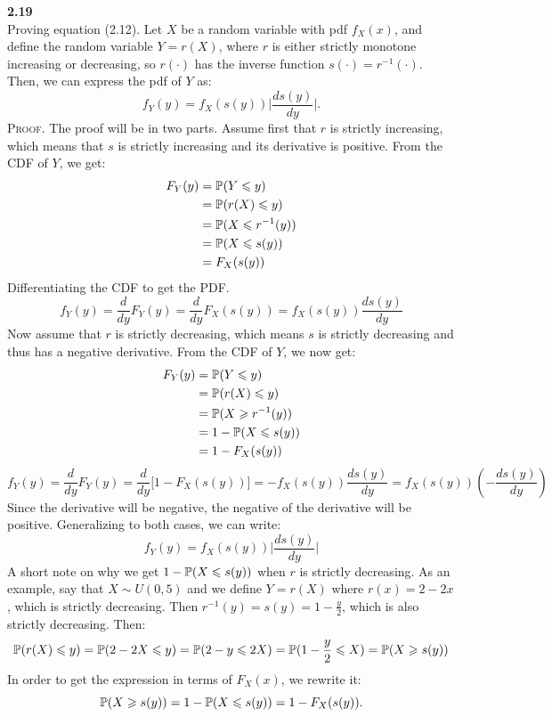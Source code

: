 \newpage\noindent
\textbf{2.19}\\  %
Proving equation (2.12). Let $X$ be a random variable with pdf $f_X(x)$, and
define the random variable $Y = r(X)$, where $r$ is either strictly monotone increasing
or decreasing, so $r(\cdot)$ has the inverse function $s(\cdot) = r^{-1}(\cdot)$.
Then, we can express the pdf of $Y$ as:
$$
f_Y(y) = f_X(s(y))\Big|\frac{ds(y)}{dy}\Big|.
$$
\textsc{Proof}. The proof will be in two parts. Assume first that $r$ is strictly increasing,
which means that $s$ is strictly increasing and its derivative is positive.
From the CDF of $Y$, we get:
\begin{align*}
    F_Y(y) &= \P(Y\leq y) \\
    &= \P(r(X)\leq y) \\
    &= \P(X\leq r^{-1}(y)) \\
    &= \P(X\leq s(y)) \\
    &= F_X(s(y))
\end{align*}
Differentiating the CDF to get the PDF.
$$
f_Y(y) = \frac{d}{dy}F_Y(y)
= \frac{d}{dy}F_X(s(y)) =
f_X(s(y))\frac{ds(y)}{dy}
$$
Now assume that $r$ is strictly decreasing, which means $s$ is strictly decreasing and thus
has a negative derivative. From the CDF of $Y$, we now get:
\begin{align*}
    F_Y(y) &= \P(Y\leq y) \\
    &= \P(r(X)\leq y) \\
    &= \P(X\geq r^{-1}(y)) \\
    &= 1 - \P(X\leq s(y)) \\
    &= 1 - F_X(s(y))
\end{align*}
$$
f_Y(y) = \frac{d}{dy}F_Y(y)
= \frac{d}{dy}\big[1 - F_X(s(y))\big] =
-f_X(s(y))\frac{ds(y)}{dy} =
f_X(s(y))\left(-\frac{ds(y)}{dy}\right)
$$
Since the derivative will be negative, the negative of the derivative will be positive.
Generalizing to both cases, we can write:
\begin{equation}
    f_Y(y) = f_X(s(y))\Big|\frac{ds(y)}{dy}\Big|
    \tag*{\qed}
\end{equation}
A short note on why we get $1-\P(X\leq s(y))$ when $r$ is strictly decreasing. As an example,
say that $X\sim U(0,5)$ and we define $Y = r(X)$ where $r(x) = 2 - 2x$, which is strictly
decreasing. Then $r^{-1}(y) = s(y) = 1 - \frac{y}{2}$, which is also strictly decreasing. Then:
$$
\P(r(X) \leq y) = \P(2 - 2X \leq y) = \P(2 - y \leq 2X) = \P(1 - \frac{y}{2} \leq X) = \P(X \geq s(y))
$$
In order to get the expression in terms of $F_X(x)$, we rewrite it:
$$
\P(X \geq s(y)) = 1 - \P(X \leq s(y)) = 1 - F_X(s(y)).
$$


